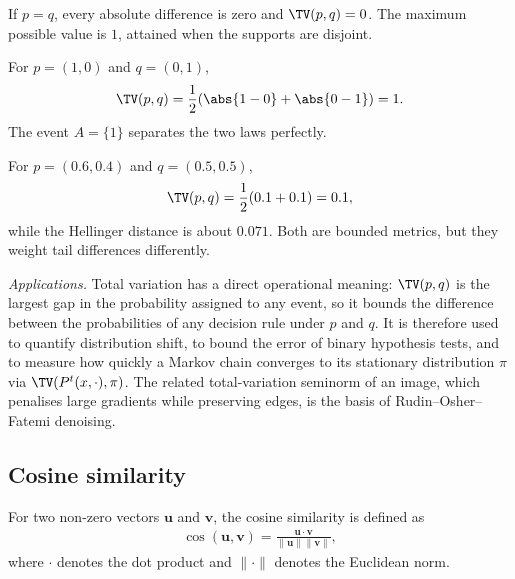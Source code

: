\documentclass[a4paper, 12pt]{book}
\begin{document}
\begin{example}
    If $p=q$, every absolute difference is zero and $\TV(p,q)=0$. The maximum possible value is $1$, attained when the supports are disjoint.
\end{example}

\begin{example}
    For $p=(1,0)$ and $q=(0,1)$,
    \begin{align}
        \TV(p,q)=\frac12(\abs{1-0}+\abs{0-1})=1.
    \end{align}
    The event $A=\{1\}$ separates the two laws perfectly.
\end{example}

\begin{example}
    For $p=(0.6,0.4)$ and $q=(0.5,0.5)$,
    \begin{align}
        \TV(p,q)=\frac12(0.1+0.1)=0.1,
    \end{align}
    while the Hellinger distance is about $0.071$. Both are bounded metrics, but they weight tail differences differently.
\end{example}

\emph{Applications.} Total variation has a direct operational meaning: $\TV(p,q)$ is the largest gap in the probability assigned to any event, so it bounds the difference between the probabilities of any decision rule under $p$ and $q$. It is therefore used to quantify distribution shift, to bound the error of binary hypothesis tests, and to measure how quickly a Markov chain converges to its stationary distribution $\pi$ via $\TV(P^t(x,\cdot),\pi)$. The related total-variation seminorm of an image, which penalises large gradients while preserving edges, is the basis of Rudin--Osher--Fatemi denoising.

\subsection{Cosine similarity}
\begin{definition}
    For two non-zero vectors $\mathbf{u}$ and $\mathbf{v}$, the cosine similarity is defined as
    \begin{align}
        \cos(\mathbf{u},\mathbf{v}) = \frac{\mathbf{u} \cdot \mathbf{v}}{\|\mathbf{u}\| \|\mathbf{v}\|},
    \end{align}
    where $\cdot$ denotes the dot product and $\|\cdot\|$ denotes the Euclidean norm.
\end{definition}
\end{document}
